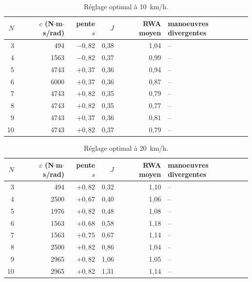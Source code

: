 \begin{table}[ht]\centering\small
\begin{tabular}{@{}r r r r r l@{}}\toprule
$N$ & $c$ (N$\cdot$m$\cdot$s/rad) & pente $s$ & $J$ & RWA moyen & manoeuvres divergentes\\\midrule
3 & 494 & $-0{,}82$ & 0{,}38 & 1{,}04 & --\\
4 & 1563 & $-0{,}82$ & 0{,}37 & 0{,}99 & --\\
5 & 4743 & $+0{,}37$ & 0{,}36 & 0{,}94 & --\\
6 & 6000 & $+0{,}37$ & 0{,}36 & 0{,}87 & --\\
7 & 4743 & $+0{,}82$ & 0{,}35 & 0{,}79 & --\\
8 & 4743 & $+0{,}82$ & 0{,}35 & 0{,}77 & --\\
9 & 4743 & $+0{,}37$ & 0{,}36 & 0{,}81 & --\\
10 & 4743 & $+0{,}82$ & 0{,}37 & 0{,}79 & --\\
\bottomrule\end{tabular}
\caption{Réglage optimal à \SI{10}{km/h}.}\label{tab:opt10}\end{table}

\begin{table}[ht]\centering\small
\begin{tabular}{@{}r r r r r l@{}}\toprule
$N$ & $c$ (N$\cdot$m$\cdot$s/rad) & pente $s$ & $J$ & RWA moyen & manoeuvres divergentes\\\midrule
3 & 494 & $+0{,}82$ & 0{,}32 & 1{,}10 & --\\
4 & 2500 & $+0{,}67$ & 0{,}40 & 1{,}06 & --\\
5 & 1976 & $+0{,}82$ & 0{,}48 & 1{,}08 & --\\
6 & 1563 & $+0{,}68$ & 0{,}58 & 1{,}18 & --\\
7 & 1563 & $+0{,}75$ & 0{,}67 & 1{,}14 & --\\
8 & 2500 & $+0{,}82$ & 0{,}86 & 1{,}04 & --\\
9 & 2965 & $+0{,}82$ & 1{,}06 & 1{,}05 & --\\
10 & 2965 & $+0{,}82$ & 1{,}31 & 1{,}14 & --\\
\bottomrule\end{tabular}
\caption{Réglage optimal à \SI{20}{km/h}.}\label{tab:opt20}\end{table}

